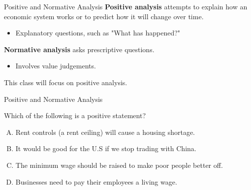 \documentclass[11pt,t]{beamer}
\begin{document}
\begin{frame}[c]
\end{frame}

\begin{frame}{Positive and Normative Analysis}
  \textbf{Positive analysis} attempts to explain how an economic system works or to predict how it will change over time.

  \begin{itemize}
    \item Explanatory questions, such as "What has happened?"
  \end{itemize}

  \bigskip
  \textbf{Normative analysis} asks prescriptive questions.

  \begin{itemize}
    \item Involves value judgements.
  \end{itemize}

  \bigskip
  \begin{center}
  This class will focus on positive analysis.
  \end{center}
\end{frame}

\begin{frame}{Positive and Normative Analysis}
  
  Which of the following is a positive statement?

  \bigskip
  \begin{enumerate}[A)]
    \item Rent controls (a rent ceiling) will cause a housing shortage.
    \item It would be good for the U.S if we stop trading with China.
    \item The minimum wage should be raised to make poor people better off.
    \item Businesses need to pay their employees a living wage.
  \end{enumerate}
\end{frame}
\end{document}
